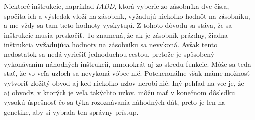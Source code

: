 Niektoré inštrukcie, napríklad \textit{IADD}, ktorá vyberie zo zásobníka dve čísla, spočíta ich a výsledok vloží na zásobník, vyžadujú niekoľko hodnôt na zásobníku, a nie vždy sa tam tieto hodnoty vyskytujú. Z tohoto dôvodu sa stáva, že sa inštrukcie musia preskočiť. To znamená, že ak je zásobník prázdny, žiadna inštrukcia vyžadujúca hodnoty na zásobníku sa nevykoná. Avšak tento nedostatok sa nedá vyriešiť jednoduchou cestou, pretože je spôsobený vykonávaním náhodných inštrukcií, mnohokrát aj zo stredu funkcie. Môže sa teda stať, že vo veľa uzloch sa nevykoná vôbec nič. Potencionálne však máme možnosť vytvoriť zložitý obvod aj keď niekoľko uzlov nerobí nič. Iný pohľad na vec je, že aj obvody, v ktorých je veľa takýchto uzlov, môžu mať v konečnom dôsledku vysokú úspešnosť čo sa týka rozoznávania náhodných dát, preto je len na genetike, aby si vybrala ten správny prístup. 
